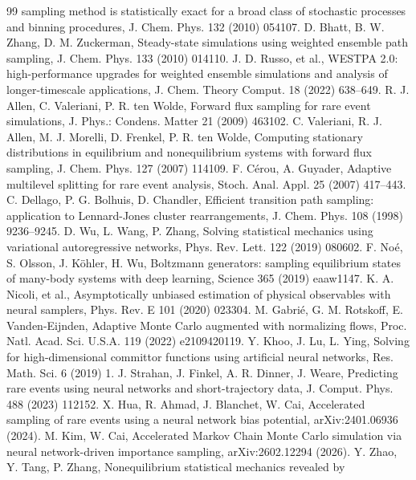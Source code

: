 \documentclass[a4paper,fleqn]{cas-sc}
\begin{document}
\begin{thebibliography}{99}
sampling method is statistically exact for a broad class of stochastic processes and binning
procedures, J. Chem. Phys. 132 (2010) 054107.
 D. Bhatt, B. W. Zhang, D. M. Zuckerman, Steady-state simulations using
weighted ensemble path sampling, J. Chem. Phys. 133 (2010) 014110.
 J. D. Russo, et al., WESTPA 2.0: high-performance upgrades for weighted
ensemble simulations and analysis of longer-timescale applications, J. Chem. Theory Comput. 18
(2022) 638--649.
 R. J. Allen, C. Valeriani, P. R. ten Wolde, Forward flux sampling for rare
event simulations, J. Phys.: Condens. Matter 21 (2009) 463102.
 C. Valeriani, R. J. Allen, M. J. Morelli, D. Frenkel, P. R. ten Wolde,
Computing stationary distributions in equilibrium and nonequilibrium systems with forward flux
sampling, J. Chem. Phys. 127 (2007) 114109.
 F. C\'erou, A. Guyader, Adaptive multilevel splitting for rare event analysis,
Stoch. Anal. Appl. 25 (2007) 417--443.
 C. Dellago, P. G. Bolhuis, D. Chandler, Efficient transition path sampling:
application to Lennard-Jones cluster rearrangements, J. Chem. Phys. 108 (1998) 9236--9245.
 D. Wu, L. Wang, P. Zhang, Solving statistical mechanics using variational
autoregressive networks, Phys. Rev. Lett. 122 (2019) 080602.
 F. No\'e, S. Olsson, J. K\"ohler, H. Wu, Boltzmann generators: sampling
equilibrium states of many-body systems with deep learning, Science 365 (2019) eaaw1147.
 K. A. Nicoli, et al., Asymptotically unbiased estimation of physical
observables with neural samplers, Phys. Rev. E 101 (2020) 023304.
 M. Gabri\'e, G. M. Rotskoff, E. Vanden-Eijnden, Adaptive Monte Carlo augmented
with normalizing flows, Proc. Natl. Acad. Sci. U.S.A. 119 (2022) e2109420119.
 Y. Khoo, J. Lu, L. Ying, Solving for high-dimensional committor functions using
artificial neural networks, Res. Math. Sci. 6 (2019) 1.
 J. Strahan, J. Finkel, A. R. Dinner, J. Weare, Predicting rare events using
neural networks and short-trajectory data, J. Comput. Phys. 488 (2023) 112152.
 X. Hua, R. Ahmad, J. Blanchet, W. Cai, Accelerated sampling of rare events using
a neural network bias potential, arXiv:2401.06936 (2024).
 M. Kim, W. Cai, Accelerated Markov Chain Monte Carlo simulation via neural
network-driven importance sampling, arXiv:2602.12294 (2026).
 Y. Zhao, Y. Tang, P. Zhang, Nonequilibrium statistical mechanics revealed by

\end{thebibliography}
\end{document}
